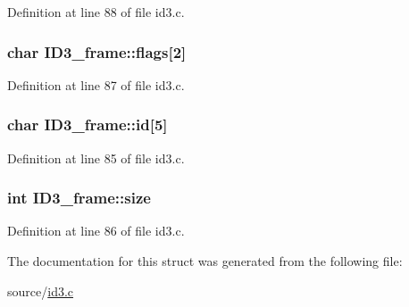 Definition at line 88 of file id3.\-c.

\hypertarget{structID3__frame_a27277b31d6dff90dfae37812f745f371}{
\subsubsection[{flags}]{\setlength{\rightskip}{0pt plus 5cm}char I\-D3\-\_\-frame\-::flags\mbox{[}2\mbox{]}}}\label{structID3__frame_a27277b31d6dff90dfae37812f745f371}


Definition at line 87 of file id3.\-c.

\hypertarget{structID3__frame_a4dc7f26d0d8d874d4b26250017536c3a}{
\subsubsection[{id}]{\setlength{\rightskip}{0pt plus 5cm}char I\-D3\-\_\-frame\-::id\mbox{[}5\mbox{]}}}\label{structID3__frame_a4dc7f26d0d8d874d4b26250017536c3a}


Definition at line 85 of file id3.\-c.

\hypertarget{structID3__frame_aee185c3dc7a27b7d700c6b9b09b7268d}{
\subsubsection[{size}]{\setlength{\rightskip}{0pt plus 5cm}int I\-D3\-\_\-frame\-::size}}\label{structID3__frame_aee185c3dc7a27b7d700c6b9b09b7268d}


Definition at line 86 of file id3.\-c.



The documentation for this struct was generated from the following file\-:\begin{DoxyCompactItemize}
\item 
source/\hyperlink{id3_8c}{id3.\-c}\end{DoxyCompactItemize}
